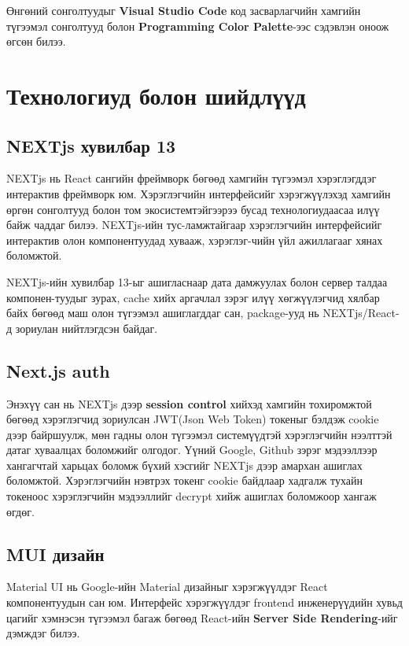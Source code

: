Өнгөний сонголтуудыг \textbf{Visual Studio Code} код засварлагчийн хамгийн түгээмэл сонголтууд\cite{VSC theme} болон \textbf{Programming Color Palette}-ээс сэдэвлэн оноож өгсөн билээ.

\section{Технологиуд болон шийдлүүд}
\subsection{NEXTjs хувилбар 13}
NEXTjs нь React сангийн фреймворк бөгөөд хамгийн түгээмэл хэрэглэгддэг интерактив фреймворк юм. Хэрэглэгчийн интерфейсийг хэрэгжүүлэхэд хамгийн өргөн сонголтууд болон том экосистем\footnotemark{}тэйгээрээ бусад технологиудаасаа илүү байж чаддаг билээ. NEXTjs-ийн тус-ламжтайгаар хэрэглэгчийн интерфейсийг интерактив олон компонентуудад хувааж, хэрэглэг-чийн үйл ажиллагааг хянах боломжтой. 

NEXTjs-ийн хувилбар 13-ыг ашигласнаар дата дамжуулах болон сервер талдаа компонен-туудыг зурах, cache хийх аргачлал зэрэг илүү хөгжүүлэгчид хялбар байх бөгөөд маш олон түгээмэл ашиглагддаг сан, package-ууд нь NEXTjs/React-д зориулан нийтлэгдсэн байдаг.

\subsection{Next.js auth}
Энэхүү сан нь NEXTjs дээр \textbf{session control} хийхэд хамгийн тохиромжтой бөгөөд хэрэглэгчид зориулсан JWT(Json Web Token) токеныг бэлдэж cookie дээр байршуулж, мөн гадны олон түгээмэл системүүдтэй хэрэглэгчийн нээлттэй датаг хуваалцах боломжийг олгодог. Үүний Google, Github зэрэг мэдээллээр хангагчтай харьцах боломж бүхий хэсгийг NEXTjs дээр амархан ашиглах боломжтой. Хэрэглэгчийн нэвтрэх токенг cookie байдлаар хадгалж тухайн токеноос хэрэглэгчийн мэдээллийг decrypt хийж ашиглах боломжоор хангаж өгдөг. 

\subsection{MUI дизайн}
Material UI нь Google-ийн Material дизайныг хэрэгжүүлдэг React компонентуудын сан юм. Интерфейс хэрэгжүүлдэг frontend инженерүүдийн хувьд цагийг хэмнэсэн түгээмэл багаж бөгөөд React-ийн \textbf{Server Side Rendering}-ийг дэмждэг билээ. 

